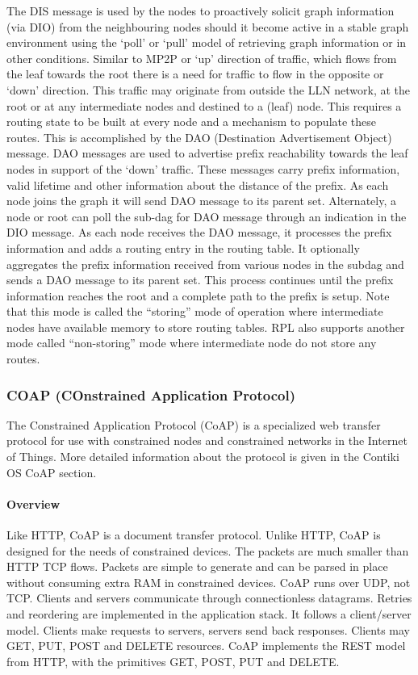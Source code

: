 The DIS message is used by the nodes to proactively solicit graph information (via DIO) from the neighbouring nodes should it become active in a stable graph environment using the ‘poll’ or ‘pull’ model of retrieving graph information or in other conditions.
Similar to MP2P or ‘up’ direction of traffic,
	which flows from the leaf towards the root there is a need for traffic to flow in the opposite or ‘down’ direction.
This traffic may originate from outside the LLN network,
	at the root or at any intermediate nodes and destined to a (leaf) node.
This requires a routing state to be built at every node and a mechanism to populate these routes.
This is accomplished by the DAO (Destination Advertisement Object) message.
DAO messages are used to advertise prefix reachability towards the leaf nodes in support of the ‘down’ traffic.
These messages carry prefix information,
	valid lifetime and other information about the distance of the prefix.
As each node joins the graph it will send DAO message to its parent set.
Alternately,
	a node or root can poll the sub-dag for DAO message through an indication in the DIO message.
As each node receives the DAO message,
	it processes the prefix information and adds a routing entry in the routing table.
It optionally aggregates the prefix information received from various nodes in the subdag and sends a DAO message to its parent set.
This process continues until the prefix information reaches the root and a complete path to the prefix is setup.
Note that this mode is called the “storing” mode of operation where intermediate nodes have available memory to store routing tables.
RPL also supports another mode called “non-storing” mode where intermediate node do not store any routes.


\subsubsection{COAP (COnstrained Application Protocol)}

The Constrained Application Protocol (CoAP) is a specialized web transfer protocol for use with constrained nodes and constrained networks in the Internet of Things.
More detailed information about the protocol is given in the Contiki OS CoAP section.

\paragraph{Overview}
Like HTTP,
	CoAP is a document transfer protocol.
Unlike HTTP,
	CoAP is designed for the needs of constrained devices.
The packets are much smaller than HTTP TCP flows.
Packets are simple to generate and can be parsed in place without consuming extra RAM in constrained devices.
CoAP runs over UDP,
	not TCP.
Clients and servers communicate through connectionless datagrams.
Retries and reordering are implemented in the application stack.
It follows a client/server model.
Clients make requests to servers,
	servers send back responses.
Clients may GET,
	PUT,
	POST and DELETE resources.
CoAP implements the REST model from HTTP,
	with the primitives GET,
	POST,
	PUT and DELETE.

